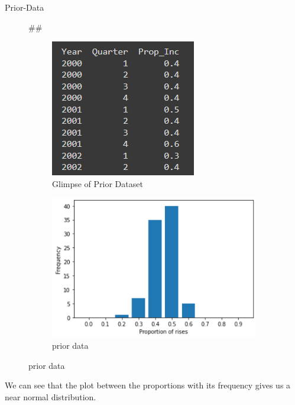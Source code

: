 \documentclass{beamer}
\newenvironment{subcolumns}[1]
 {\valign\bgroup\hsize=#1##\cr}
 {\crcr\egroup}
\newcommand{\nextsubcolumn} {\cr\noalign{\hfill}}
\begin{document}
\begin{frame}{Prior-Data}
\begin{figure}[htp]
\centering
\begin{subcolumns}{0.475\columnwidth}
  \begin{subfigure}{0.46\columnwidth}
  \centering
  \includegraphics[width=\textwidth]{Images/Prior_Data.png}
  \caption{Glimpse of Prior Dataset}
  \end{subfigure}
\nextsubcolumn
  \begin{subfigure}{0.5\columnwidth}
  \centering
  \includegraphics[width=\textwidth]{Images/FreqVsRise.png}
  \caption{prior data}
  \end{subfigure}
\end{subcolumns}
\end{figure}
We can see that the plot between the proportions with its frequency gives us a near normal distribution.
\end{frame}
\end{document}
